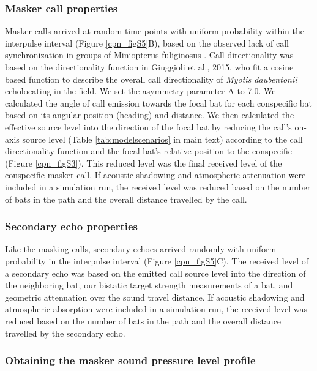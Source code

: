 \documentclass[
]{book}
\begin{document}
\hypertarget{masker-call-properties}{%
\subsubsection{Masker call properties}\label{masker-call-properties}}

Masker calls arrived at random time points with uniform probability within the
interpulse interval (Figure \ref{cpn_figS5}B), based on the observed lack of call synchronization in groups of Miniopterus fuliginosus \citep{hase2018a}. Call directionality was based on the directionality function in Giuggioli et al., 2015, who fit a cosine based function to describe the overall call directionality of \emph{Myotis daubentonii} echolocating in the field. We set the asymmetry parameter A to 7.0. We calculated the angle of call emission towards the focal bat for each conspecific bat based on its angular position (heading) and distance. We then calculated the effective source level into the direction of the focal bat by reducing the call's on-axis source level (Table \ref{tab:modelscenarios} in main text) according to the call directionality function and the focal bat's relative position to the conspecific (Figure \ref{cpn_figS3}). This reduced level was the final received level of the conspecific masker call. If acoustic shadowing and atmospheric attenuation were included in a simulation run, the received level was reduced based on the number of bats in the path and the overall distance travelled by the call.

\hypertarget{secondary-echo-properties}{%
\subsubsection{Secondary echo properties}\label{secondary-echo-properties}}

Like the masking calls, secondary echoes arrived randomly with uniform probability in the interpulse interval (Figure \ref{cpn_figS5}C). The received level of a secondary echo was based on the emitted call source level into the direction of the neighboring bat, our bistatic target strength measurements of a bat, and geometric attenuation over the sound travel distance. If acoustic shadowing and atmospheric absorption were included in a simulation run, the received level was reduced based on the number of bats in the path and the overall distance travelled by the secondary echo.

\hypertarget{obtaining-the-masker-sound-pressure-level-profile}{%
\subsubsection{Obtaining the masker sound pressure level profile}\label{obtaining-the-masker-sound-pressure-level-profile}}
\end{document}
